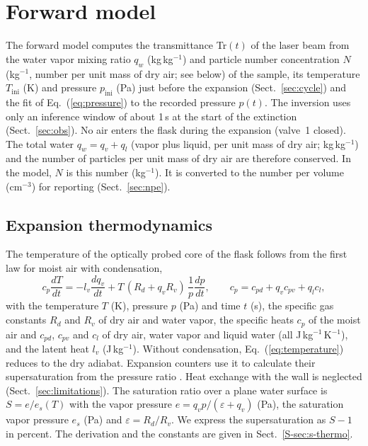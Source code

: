 \documentclass[preprint,review,12pt,authoryear]{elsarticle}
\begin{document}
\section{Forward model}
\label{sec:model}
The forward model computes the transmittance Tr$(t)$ of the laser beam from the
water vapor mixing ratio $q_w$ (kg\,kg$^{-1}$) and particle number concentration $N$ (kg$^{-1}$, number
per unit mass of dry air; see below) of the sample,
its temperature $T_\mathrm{ini}$ (K) and pressure $p_\mathrm{ini}$ (Pa) just before the expansion
(Sect.~\ref{sec:cycle}) and the fit of
Eq.~(\ref{eq:pressure}) to the recorded pressure $p(t)$.
The inversion uses only an inference window of about 1\,s at the start of the extinction
(Sect.~\ref{sec:obs}).
No air enters the flask during the expansion (valve~1 closed). The total water $q_w = q_v + q_l$
(vapor plus liquid, per unit mass of dry air; kg\,kg$^{-1}$) and the number of particles per unit mass
of dry air are therefore conserved. In the model, $N$ is this number (kg$^{-1}$). It is
converted to the number per volume (cm$^{-3}$) for reporting (Sect.~\ref{sec:npe}).

\subsection{Expansion thermodynamics}
\label{sec:thermo}
The temperature of the optically probed core of the flask follows from the first law for moist
air with condensation,
\begin{equation}
c_p \frac{dT}{dt} = -l_v \frac{dq_v}{dt} + T\,(R_d + q_v R_v)\,\frac{1}{p}\frac{dp}{dt},
\qquad c_p = c_{pd} + q_v c_{pv} + q_l c_l,
\label{eq:temperature}
\end{equation}
with the temperature $T$ (K), pressure $p$ (Pa) and time $t$ (s), the specific gas constants $R_d$
and $R_v$ of dry air and water vapor, the specific heats $c_p$ of the moist air and $c_{pd}$, $c_{pv}$
and $c_l$ of dry air, water vapor and liquid water (all J\,kg$^{-1}$\,K$^{-1}$), and the latent heat $l_v$
(J\,kg$^{-1}$). Without condensation, Eq.~(\ref{eq:temperature}) reduces to the dry adiabat. Expansion
counters use it to calculate their supersaturation from the pressure ratio
\citep{miller1982supersaturation}. Heat exchange with the wall is neglected (Sect.~\ref{sec:limitations}). The
saturation ratio
over a plane water surface is $S = e/e_s(T)$ with the vapor pressure $e = q_v
p/(\varepsilon +
q_v)$ (Pa), the saturation vapor pressure $e_s$ (Pa) and $\varepsilon = R_d/R_v$.
We express the supersaturation as $S - 1$ in percent.
The derivation and
the constants are given in Sect.~\ref{S-sec:s-thermo}.
\end{document}
